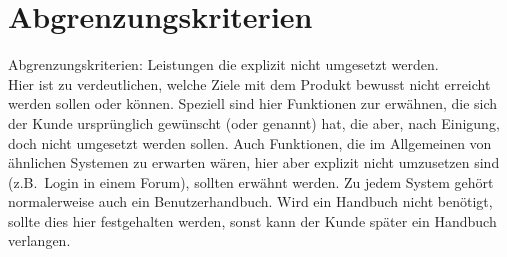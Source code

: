 \section{Abgrenzungskriterien}\label{sec:abgrenzungskriterien}
Abgrenzungskriterien: Leistungen die explizit nicht umgesetzt werden.\\
Hier ist zu verdeutlichen, welche Ziele mit dem Produkt bewusst nicht erreicht werden sollen oder können. 
Speziell sind hier Funktionen zur erwähnen, die sich der Kunde ursprünglich gewünscht (oder genannt) hat, die aber, nach Einigung, 
doch nicht umgesetzt werden sollen.
Auch Funktionen, die im Allgemeinen von ähnlichen Systemen zu erwarten wären,
hier aber explizit nicht umzusetzen sind (z.B.\ Login in einem Forum), sollten erwähnt werden.
Zu jedem System gehört normalerweise auch ein Benutzerhandbuch.
Wird ein Handbuch nicht benötigt, sollte dies hier festgehalten werden, sonst kann der Kunde später ein Handbuch verlangen.


